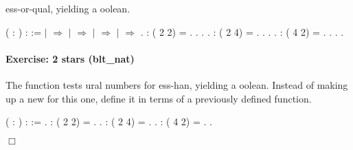 \documentclass[12pt]{report}
\begin{document}
    ess-or-qual, yielding a oolean. \begin{coqdoccode}
\coqdocemptyline
\coqdocnoindent
{}  (  : ) :  :=\coqdoceol
\coqdocindent{1.00em}
  \coqdoceol
\coqdocindent{1.00em}
\ensuremath{|}  \ensuremath{\Rightarrow} \coqdoceol
\coqdocindent{1.00em}
\ensuremath{|}   \ensuremath{\Rightarrow}\coqdoceol
\coqdocindent{3.00em}
  \coqdoceol
\coqdocindent{3.00em}
\ensuremath{|}  \ensuremath{\Rightarrow} \coqdoceol
\coqdocindent{3.00em}
\ensuremath{|}   \ensuremath{\Rightarrow}   \coqdoceol
\coqdocindent{3.00em}
\coqdoceol
\coqdocindent{1.00em}
.\coqdoceol
\coqdocemptyline
\coqdocnoindent
{} :             ( 2 2) = .\coqdoceol
\coqdocnoindent
{}. . .\coqdoceol
\coqdocnoindent
{} :             ( 2 4) = .\coqdoceol
\coqdocnoindent
{}. . .\coqdoceol
\coqdocnoindent
{} :             ( 4 2) = .\coqdoceol
\coqdocnoindent
{}. . .\coqdoceol
\coqdocemptyline
\end{coqdoccode}
\paragraph{Exercise: 2 stars (blt\_nat)}

 The  function tests ural numbers for ess-han,
    yielding a oolean.  Instead of making up a new  for
    this one, define it in terms of a previously defined function. \begin{coqdoccode}
\coqdocemptyline
\coqdocnoindent
{}  (  : ) :  :=\coqdoceol
\coqdocindent{1.00em}
 .\coqdoceol
\coqdocemptyline
\coqdocnoindent
{} :             ( 2 2) = .\coqdoceol
 .\coqdoceol
\coqdocnoindent
{} :             ( 2 4) = .\coqdoceol
 .\coqdoceol
\coqdocnoindent
{} :             ( 4 2) = .\coqdoceol
 .\coqdoceol
\coqdocemptyline
\end{coqdoccode}
\ensuremath{\Box} \begin{coqdoccode}
\coqdocemptyline
\end{coqdoccode}
\end{document}
